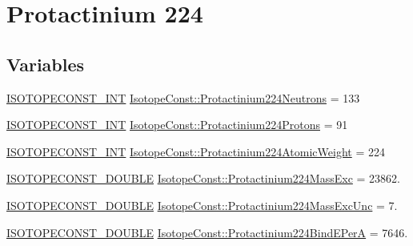 \hypertarget{group___isotope_const-_protactinium-_pa224}{}\section{Protactinium 224}
\label{group___isotope_const-_protactinium-_pa224}
\subsection*{Variables}
\begin{DoxyCompactItemize}
\item 
\mbox{\hyperlink{group___isotope_const-_macros_ga5f18360b3e99483a35c32d789e62621c}{I\+S\+O\+T\+O\+P\+E\+C\+O\+N\+S\+T\+\_\+\+I\+NT}} \mbox{\hyperlink{group___isotope_const-_protactinium-_pa224_ga44f7f4621ca6fdac22ab6440d059cf0a}{Isotope\+Const\+::\+Protactinium224\+Neutrons}} = 133
\item 
\mbox{\hyperlink{group___isotope_const-_macros_ga5f18360b3e99483a35c32d789e62621c}{I\+S\+O\+T\+O\+P\+E\+C\+O\+N\+S\+T\+\_\+\+I\+NT}} \mbox{\hyperlink{group___isotope_const-_protactinium-_pa224_ga147414c3d867d5c74a67cee34d88eaf6}{Isotope\+Const\+::\+Protactinium224\+Protons}} = 91
\item 
\mbox{\hyperlink{group___isotope_const-_macros_ga5f18360b3e99483a35c32d789e62621c}{I\+S\+O\+T\+O\+P\+E\+C\+O\+N\+S\+T\+\_\+\+I\+NT}} \mbox{\hyperlink{group___isotope_const-_protactinium-_pa224_ga0c10a5d0a412dea5ad5da00bb7cd7630}{Isotope\+Const\+::\+Protactinium224\+Atomic\+Weight}} = 224
\item 
\mbox{\hyperlink{group___isotope_const-_macros_ga8f45a7272ce02c0b4c65c44636ed719a}{I\+S\+O\+T\+O\+P\+E\+C\+O\+N\+S\+T\+\_\+\+D\+O\+U\+B\+LE}} \mbox{\hyperlink{group___isotope_const-_protactinium-_pa224_gaedc112ba6a41feafeb1f518625b65fb5}{Isotope\+Const\+::\+Protactinium224\+Mass\+Exc}} = 23862.
\item 
\mbox{\hyperlink{group___isotope_const-_macros_ga8f45a7272ce02c0b4c65c44636ed719a}{I\+S\+O\+T\+O\+P\+E\+C\+O\+N\+S\+T\+\_\+\+D\+O\+U\+B\+LE}} \mbox{\hyperlink{group___isotope_const-_protactinium-_pa224_gab0fce0161c5413e6daa33f2158000fe0}{Isotope\+Const\+::\+Protactinium224\+Mass\+Exc\+Unc}} = 7.
\item 
\mbox{\hyperlink{group___isotope_const-_macros_ga8f45a7272ce02c0b4c65c44636ed719a}{I\+S\+O\+T\+O\+P\+E\+C\+O\+N\+S\+T\+\_\+\+D\+O\+U\+B\+LE}} \mbox{\hyperlink{group___isotope_const-_protactinium-_pa224_gab17eda5db51bb863b7788a6dac5e577f}{Isotope\+Const\+::\+Protactinium224\+Bind\+E\+PerA}} = 7646.

\end{DoxyCompactItemize}
